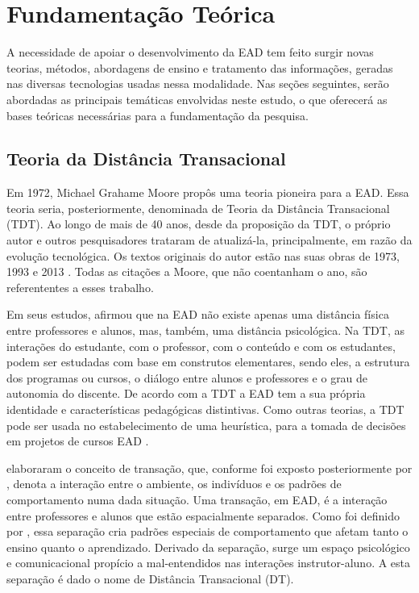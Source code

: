 \chapter{Fundamentação Teórica}

A necessidade de apoiar o desenvolvimento da EAD tem feito surgir novas teorias,
métodos, abordagens de ensino e tratamento das informações, geradas nas diversas
tecnologias usadas nessa modalidade. Nas seções seguintes, serão abordadas as
principais temáticas envolvidas neste estudo, o que oferecerá as bases teóricas
necessárias para a fundamentação da pesquisa.

\section{Teoria da Distância Transacional}

Em 1972, Michael Grahame Moore propôs uma teoria pioneira para a EAD. Essa
teoria seria, posteriormente, denominada de Teoria da Distância Transacional
(TDT). Ao longo de mais de 40 anos, desde da proposição da TDT, o próprio autor
e outros pesquisadores trataram de atualizá-la, principalmente, em razão da
evolução tecnológica. Os textos originais do autor estão nas suas obras de 1973,
1993 e 2013 \cite{moore1973transational}. Todas as citações a Moore, que não
coentanham o ano, são referententes a esses trabalho.

Em seus estudos,  afirmou que na EAD não
existe apenas uma distância física entre professores e alunos, mas, também, uma
distância psicológica. Na TDT, as interações do estudante, com o professor, com
o conteúdo e com os estudantes, podem ser estudadas com base em construtos
elementares, sendo eles, a estrutura dos programas ou cursos, o diálogo entre
alunos e professores e o grau de autonomia do discente. De acordo com a TDT a
EAD tem a sua própria identidade e características pedagógicas distintivas. Como
outras teorias, a TDT pode ser usada no estabelecimento de uma heurística, para
a tomada de decisões em projetos de cursos EAD
\citeauthor{moore1973transational}.

 elaboraram o conceito de transação, que, conforme
foi exposto posteriormente por , denota a
interação entre o ambiente, os indivíduos e os padrões de comportamento numa
dada situação. Uma transação, em EAD, é a interação entre professores e alunos
que estão espacialmente separados. Como foi definido por
, essa separação cria padrões especiais
de comportamento que afetam tanto o ensino quanto o aprendizado. Derivado da
separação, surge um espaço psicológico e comunicacional propício a
mal-entendidos nas interações instrutor-aluno. A esta separação é dado o nome de
Distância Transacional (DT).

